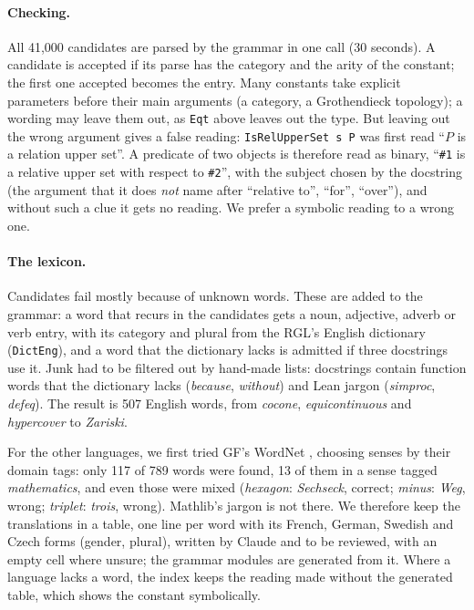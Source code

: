 \documentclass{easychair}
\newcommand{\ttt}[1]{\texttt{#1}}
\begin{document}
\paragraph{Checking.} All 41,000 candidates are parsed by the grammar in one call (30 seconds).
A candidate is accepted if its parse has the category and the arity of the constant; the first
one accepted becomes the entry. Many constants take explicit parameters before their main
arguments (a category, a Grothendieck topology); a wording may leave them out, as \ttt{Eqt}
above leaves out the type. But leaving out the wrong argument gives a false reading:
\ttt{IsRelUpperSet s P} was first read ``$P$ is a relation upper set''. A predicate of two
objects is therefore read as binary, ``\ttt{\#1} is a relative upper set with respect to
\ttt{\#2}'', with the subject chosen by the docstring (the argument that it does \emph{not} name
after ``relative to'', ``for'', ``over''), and without such a clue it gets no reading. We prefer
a symbolic reading to a wrong one.

\paragraph{The lexicon.} Candidates fail mostly because of unknown words. These are added to the
grammar: a word that recurs in the candidates gets a noun, adjective, adverb or verb entry, with
its category and plural from the RGL's English dictionary (\ttt{DictEng}), and a word that the
dictionary lacks is admitted if three docstrings use it. Junk had to be filtered out by hand-made
lists: docstrings contain function words that the dictionary lacks (\emph{because},
\emph{without}) and Lean jargon (\emph{simproc}, \emph{defeq}). The result is 507 English words,
from \emph{cocone}, \emph{equicontinuous} and \emph{hypercover} to \emph{Zariski}.

For the other languages, we first tried GF's WordNet \cite{miller-1995,angelov-2020}, choosing
senses by their domain tags: only 117 of 789 words were found, 13 of them in a sense tagged
\emph{mathematics}, and even those were mixed (\emph{hexagon}: \emph{Sechseck}, correct;
\emph{minus}: \emph{Weg}, wrong; \emph{triplet}: \emph{trois}, wrong). Mathlib's jargon is not
there. We therefore keep the translations in a table, one line per word with its French,
German, Swedish and Czech forms (gender, plural), written by Claude and to be reviewed, with an
empty cell where unsure; the grammar modules are generated from it. Where a language lacks a
word, the index keeps the reading made without the generated table, which shows the constant
symbolically.
\end{document}
